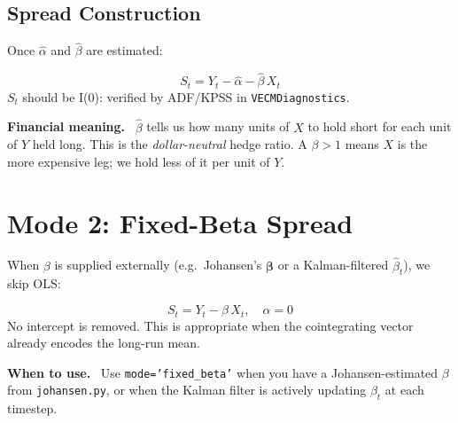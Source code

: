 \documentclass[10pt,a4paper,twocolumn]{article}
\begin{document}
\subsection{Spread Construction}

Once $\hat\alpha$ and $\hat\beta$ are estimated:
\begin{tcolorbox}[mathbox={Formula 3 --- OLS Spread}]
\vspace{-4pt}
\begin{equation}\label{eq:ols_spread}
  S_t = Y_t - \hat\alpha - \hat\beta\, X_t
\end{equation}
\vspace{-2pt}
$S_t$ should be I(0): verified by ADF/KPSS in \texttt{VECMDiagnostics}.
\end{tcolorbox}

\noindent\textbf{Financial meaning.}~
$\hat\beta$ tells us how many units of $X$ to hold short for each unit of
$Y$ held long.  This is the \emph{dollar-neutral} hedge ratio.  A $\beta > 1$
means $X$ is the more expensive leg; we hold less of it per unit of $Y$.

\section{Mode 2: Fixed-Beta Spread}

When $\beta$ is supplied externally (e.g.\ Johansen's $\boldsymbol\beta$
or a Kalman-filtered $\hat\beta_t$), we skip OLS:

\begin{tcolorbox}[mathbox={Formula 4 --- Fixed-Beta Spread}]
\vspace{-4pt}
\begin{equation}\label{eq:fixed_spread}
  S_t = Y_t - \beta\, X_t, \quad \alpha = 0
\end{equation}
\vspace{-2pt}
No intercept is removed.  This is appropriate when the cointegrating
vector already encodes the long-run mean.
\end{tcolorbox}

\noindent\textbf{When to use.}~
Use \texttt{mode='fixed\_beta'} when you have a Johansen-estimated $\beta$
from \texttt{johansen.py}, or when the Kalman filter is actively updating
$\beta_t$ at each timestep.

\end{document}
